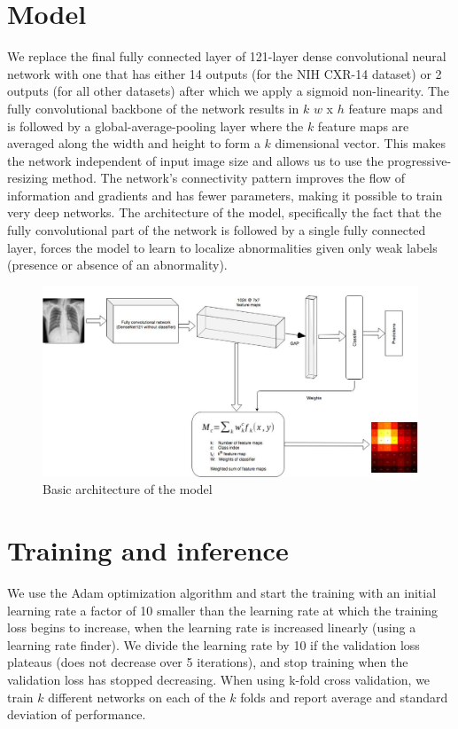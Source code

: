 \documentclass[oneside,a4paper]{article}
\begin{document}
\section{Model}
We replace the final fully connected layer of 121-layer dense convolutional
neural network with one that has either 14 outputs (for the NIH CXR-14 dataset)
or 2 outputs (for all other datasets) after which we apply a sigmoid
non-linearity. The fully convolutional backbone of the network results in $k$
$w$ x $h$ feature maps and is followed by a global-average-pooling layer where
the $k$ feature maps are averaged along the width and height to form a $k$
dimensional vector. This makes the network independent of input image size and
allows us to use the
progressive-resizing method. The network's connectivity pattern improves the flow of information and
gradients and has fewer parameters, making it possible to train very deep
networks. The architecture of the model, specifically the fact that the fully
convolutional part of the network is followed by a single fully connected layer,
forces the model to learn to localize abnormalities given only weak labels (presence or absence of an abnormality).

\begin{figure}[]
  \centering \includegraphics[width=\textwidth]{images/arch}
  \caption{Basic architecture of the model}
  \label{architecture}
\end{figure}

\section{Training and inference}
We use the Adam optimization algorithm and start the training with an initial
learning rate a factor of 10 smaller than the learning rate at which the
training loss begins to increase, when the learning rate is increased linearly
(using a learning rate finder). We divide the learning rate by 10 if the
validation loss plateaus (does not decrease over 5 iterations), and stop
training when the validation loss has stopped decreasing. When using k-fold
cross validation, we train $k$ different networks on each of the $k$ folds and
report average and standard deviation
of performance.\\
\end{document}
